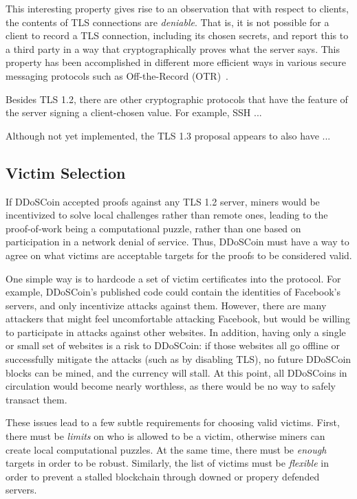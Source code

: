 This interesting property gives rise to an observation that with respect to
clients, the contents of TLS connections are \emph{deniable}. That is, it is not
possible for a client to record a TLS connection, including its chosen secrets,
and report this to a third party in a way that cryptographically proves what the
server says. This property has been accomplished in different more efficient ways in various
secure messaging protocols such as Off-the-Record (OTR)~\cite{otr}.

Besides TLS 1.2, there are other cryptographic protocols that have the feature
of the server signing a client-chosen value. For example, SSH ... \TK

Although not yet implemented, the TLS 1.3 proposal appears to also have ... \TK




\subsection{Victim Selection}
\label{sec:victim}

If DDoSCoin accepted proofs against any TLS 1.2 server, miners would be
incentivized to solve local challenges rather than remote ones, leading to the
proof-of-work being a computational puzzle, rather than one based on
participation in a network denial of service. Thus, DDoSCoin must have a way to
agree on what victims are acceptable targets for the proofs to be considered
valid.

One simple way is to hardcode a set of victim certificates into the protocol.
For example, DDoSCoin's published code could contain the identities of
Facebook's servers, and only incentivize attacks against them. However, there
are many attackers that might feel uncomfortable attacking Facebook, but would
be willing to participate in attacks against other websites. In addition, having
only a single or small set of websites is a risk to DDoSCoin: if those websites
all go offline or successfully mitigate the attacks (such as by disabling TLS),
no future DDoSCoin blocks can be mined, and the currency will stall. At this
point, all DDoSCoins in circulation would become nearly worthless, as there
would be no way to safely transact them.

These issues lead to a few subtle requirements for choosing valid victims.
First, there must be \emph{limits} on who is allowed to be a victim, otherwise
miners can create local computational puzzles. At the same time, there must be
\emph{enough} targets in order to be robust. Similarly, the list of victims must
be \emph{flexible} in order to prevent a stalled blockchain through downed or
propery defended servers.

